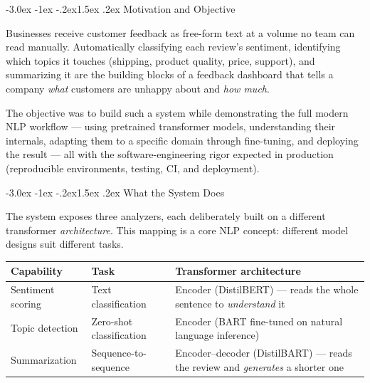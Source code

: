 \documentclass[11pt]{article}
\makeatletter
\renewcommand{\section}{\@startsection{section}{1}{\z@}%
  {-3.0ex \@plus -1ex \@minus -.2ex}{1.5ex \@plus.2ex}%
  {\Large\bfseries\color{primarycolor}}}
\makeatother
\begin{document}
\section{Motivation and Objective}

Businesses receive customer feedback as free-form text at a volume no team can
read manually. Automatically classifying each review's sentiment, identifying
which topics it touches (shipping, product quality, price, support), and
summarizing it are the building blocks of a feedback dashboard that tells a
company \emph{what} customers are unhappy about and \emph{how much}.

The objective was to build such a system while demonstrating the full modern NLP
workflow --- using pretrained transformer models, understanding their internals,
adapting them to a specific domain through fine-tuning, and deploying the result
--- all with the software-engineering rigor expected in production
(reproducible environments, testing, CI, and deployment).

\section{What the System Does}

The system exposes three analyzers, each deliberately built on a different
transformer \emph{architecture}. This mapping is a core NLP concept: different
model designs suit different tasks.

\begin{center}
\renewcommand{\arraystretch}{1.4}
\begin{tabular}{|>{\raggedright\arraybackslash}p{3.2cm}|>{\raggedright\arraybackslash}p{4.6cm}|>{\raggedright\arraybackslash}p{5.2cm}|}
\hline
\textbf{Capability} & \textbf{Task} & \textbf{Transformer architecture} \\
\hline
Sentiment scoring & Text classification & Encoder (DistilBERT) --- reads the whole
sentence to \emph{understand} it \\
\hline
Topic detection & Zero-shot classification & Encoder (BART fine-tuned on natural
language inference) \\
\hline
Summarization & Sequence-to-sequence & Encoder--decoder (DistilBART) --- reads
the review and \emph{generates} a shorter one \\
\hline
\end{tabular}
\end{center}
\end{document}
